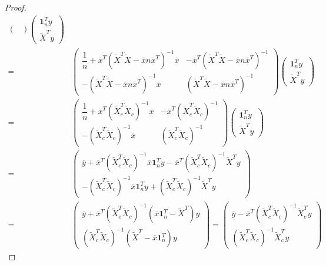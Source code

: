 \begin{proof}
\begin{align*}
\begin{pmatrix}
		\end{pmatrix}
		\begin{pmatrix}
			\mathbf{1}_n^Ty \\
			\tilde{X}^Ty
		\end{pmatrix} \\
		=&
		\begin{pmatrix}
			\dfrac{1}{n}+\overline{x}^T(\tilde{X}^T\tilde{X}-\overline{x}n\overline{x}^T)^{-1}\overline{x} & -\overline{x}^T(\tilde{X}^T\tilde{X}-\overline{x}n\overline{x}^T)^{-1} \\
			-(\tilde{X}^T\tilde{X}-\overline{x}n\overline{x}^T)^{-1}\overline{x} & (\tilde{X}^T\tilde{X}-\overline{x}n\overline{x}^T)^{-1}
		\end{pmatrix}
		\begin{pmatrix}
			\mathbf{1}_n^Ty \\
			\tilde{X}^Ty
		\end{pmatrix} \\
		=&
		\begin{pmatrix}
			\dfrac{1}{n}+\overline{x}^T(\tilde{X}_c^T\tilde{X}_c)^{-1}\overline{x} & -\overline{x}^T(\tilde{X}_c^T\tilde{X}_c)^{-1} \\
			-(\tilde{X}_c^T\tilde{X}_c)^{-1}\overline{x} & (\tilde{X}_c^T\tilde{X}_c)^{-1}
		\end{pmatrix}
		\begin{pmatrix}
			\mathbf{1}_n^Ty \\
			\tilde{X}^Ty
		\end{pmatrix} \\
		=&
		\begin{pmatrix}
		\overline{y}+\overline{x}^T(\tilde{X}_c^T\tilde{X}_c)^{-1}\overline{x}\mathbf{1}_n^Ty-\overline{x}^T(\tilde{X}_c^T\tilde{X}_c)^{-1}\tilde{X}^Ty \\
		-(\tilde{X}_c^T\tilde{X}_c)^{-1}\overline{x}\mathbf{1}_n^Ty+(\tilde{X}_c^T\tilde{X}_c)^{-1}\tilde{X}^Ty
		\end{pmatrix} \\
		=&
		\begin{pmatrix}
		\overline{y}+\overline{x}^T(\tilde{X}_c^T\tilde{X}_c)^{-1}(\overline{x}\mathbf{1}_n^T-\tilde{X}^T)y \\
		(\tilde{X}_c^T\tilde{X}_c)^{-1}(\tilde{X}^T-\overline{x}\mathbf{1}_n^T)y
		\end{pmatrix}=
		\begin{pmatrix}
		\overline{y}-\overline{x}^T(\tilde{X}_c^T\tilde{X}_c)^{-1}\tilde{X}_c^Ty \\
		(\tilde{X}_c^T\tilde{X}_c)^{-1}\tilde{X}_c^Ty

\end{pmatrix}
\end{align*}
\end{proof}
